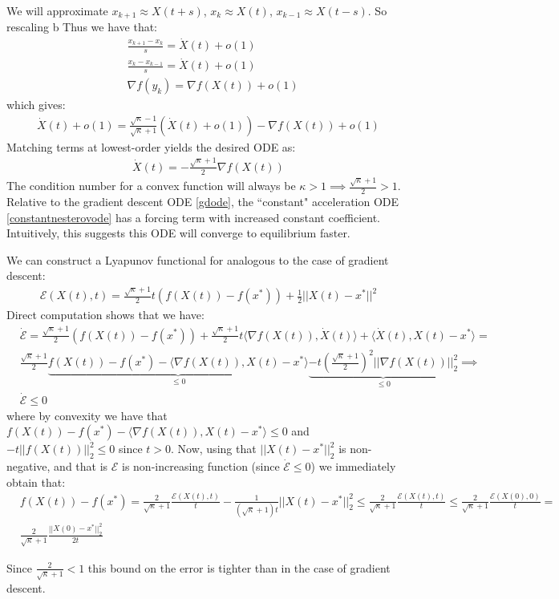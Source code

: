  We will approximate $x_{k+1} \approx X(t+s)$, $x_k \approx X(t)$, $x_{k-1} \approx X(t-s)$. So rescaling b
 Thus we have that:
 \begin{align*}
     & \frac{x_{k+1} - x_k}{s} = \dot{X}(t) + o(1) \\
     & \frac{x_k - x_{k-1}}{s} = \dot{X}(t) + o(1) \\
     & \nabla f(y_k) = \nabla f(X(t)) + o(1)
 \end{align*}
 which gives:
 \begin{align*}
     \dot{X}(t) + o(1) = \frac{\sqrt{\kappa}-1}{\sqrt{\kappa}+1} \left( \dot{X}(t) + o(1)\right) - \nabla f(X(t)) + o(1)
 \end{align*}
 Matching terms at lowest-order yields the desired ODE as:
 \begin{align}
     \dot{X}(t) = -\frac{\sqrt{\kappa}+1}{2} \nabla f(X(t)) \label{constantnesterovode}
 \end{align}
The condition number for a convex function will always be $\kappa > 1 \implies \frac{\sqrt{\kappa}+1}{2} > 1$. Relative to the gradient descent ODE \eqref{gdode}, the ``constant" acceleration ODE \eqref{constantnesterovode} has a forcing term with increased constant coefficient. Intuitively, this suggests this ODE will converge to equilibrium faster.

We can construct a Lyapunov functional for analogous to the case of gradient descent:
\begin{align*}
    \mathcal{E}(X(t), t) = \frac{\sqrt{\kappa}+1}{2}t(f(X(t)) - f(x^*)) + \frac{1}{2}||X(t)-x^*||^2
\end{align*}
Direct computation shows that we have:
\begin{align*}
    & \dot{\mathcal{E}}= \frac{\sqrt{\kappa}+1}{2}(f(X(t)) - f(x^*)) + \frac{\sqrt{\kappa}+1}{2} t \langle \nabla f(X(t)), \dot{X}(t) \rangle + \langle \dot{X}(t), X(t)-x^* \rangle = \\
    & \frac{\sqrt{\kappa}+1}{2} \underbrace{f(X(t)) - f(x^*) - \langle \nabla f(X(t)), X(t) - x^* \rangle}_{\leq 0} \underbrace{- t (\frac{\sqrt{\kappa}+1}{2})^2 || \nabla f(X(t))||_2^2}_{\leq 0} \implies \\
    & \dot{\mathcal{E}} \leq 0
\end{align*}
where by convexity we have that $f(X(t)) - f(x^*) - \langle \nabla f(X(t)), X(t) - x^* \rangle \leq 0$ and $ - t ||f(X(t))||_2^2 \leq 0$ since $t>0$. Now, using that $||X(t)-x^*||_2^2$ is non-negative, and that is $\mathcal{E}$ is non-increasing function (since $\dot{\mathcal{E}} \leq 0$) we immediately obtain that:
\begin{align*}
    & f(X(t)) - f(x^*) = \frac{2}{\sqrt{\kappa}+1} \frac{\mathcal{E}(X(t), t)}{t} - \frac{1}{(\sqrt{\kappa}+1)t} ||X(t) - x^*||_2^2 \leq \frac{2}{\sqrt{\kappa}+1} \frac{\mathcal{E}(X(t), t)}{t} \leq \frac{2}{\sqrt{\kappa}+1} \frac{\mathcal{E}(X(0), 0)}{t} = \\ & \frac{2}{\sqrt{\kappa}+1} \frac{||X(0)-x^*||_2^2}{2t}
\end{align*}

Since $\frac{2}{\sqrt{\kappa}+1} < 1$ this bound on the error is tighter than in the case of gradient descent.






